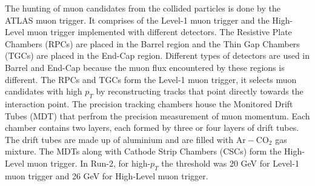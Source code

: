 The hunting of muon candidates from the collided particles is done by the ATLAS muon trigger. It comprises of the Level-1 muon trigger and the High-Level muon trigger implemented with 
different detectors. The Resistive Plate Chambers (RPCs) are placed in the Barrel region and the Thin Gap Chambers (TGCs) are placed in the End-Cap region. Different types of 
detectors are used in Barrel and End-Cap because the muon flux encountered by these regions is different. The RPCs and TGCs form the Level-1 muon trigger, it selects muon
candidates with high $p_T$ by reconstructing tracks that point directly towards the interaction point. The precision tracking 
chambers house the Monitored Drift Tubes (MDT) that perfrom the precision measurement of muon momentum. Each chamber
contains two layers, each formed by three or four layers of drift tubes. The drift tubes are made up of aluminium and are filled with $\text{Ar}-\text{CO}_2$ gas mixture.
The MDTs along with Cathode Strip Chambers (CSCs) form the High-Level muon trigger. In Run-2, for high-$p_T$ the threshold was 20 GeV for Level-1 muon trigger and 26 GeV 
for High-Level muon trigger.  


